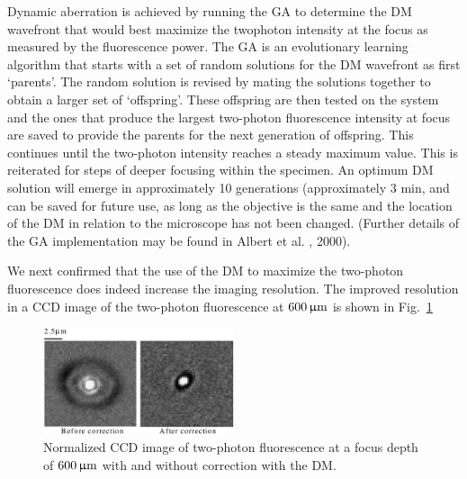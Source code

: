 Dynamic aberration is achieved by running the GA to determine the DM wavefront that would best maximize the twophoton intensity at the focus as measured by the fluorescence power. The GA is an evolutionary learning algorithm that starts with a set of random solutions for the DM wavefront as first ‘parents’. The random solution is revised by mating the solutions together to obtain a larger set of ‘offspring’. These offspring are then tested on the system and the ones that produce the largest two-photon fluorescence intensity at focus are saved to provide the parents for the next generation of offspring. This continues until the two-photon intensity reaches a steady maximum value. This is reiterated for steps of deeper focusing within the specimen. An optimum DM solution will emerge in approximately 10 generations (approximately 3 min, and can be saved for future use, as long as the objective is the same and the location of the DM in relation to the microscope has not been changed. (Further details of the GA implementation may be found in Albert et al. , 2000).


We next confirmed that the use of the DM to maximize the two-photon fluorescence does indeed increase the imaging resolution. The improved resolution in a CCD image of the two-photon fluorescence at $\unit[600]{\upmu m}$ is shown in Fig.~\ref{fig:genetic_TPFM_correction}

\begin{figure}
	\centering
		\includegraphics[width=0.50\textwidth]{images/genetic_TPFM_correction}
	\caption{Normalized CCD image of two-photon fluorescence at a focus depth of $\unit[600]{\upmu m}$ with and without correction with the DM. \cite{Genetic_MPFM}}
	\label{fig:genetic_TPFM_correction}
\end{figure}



